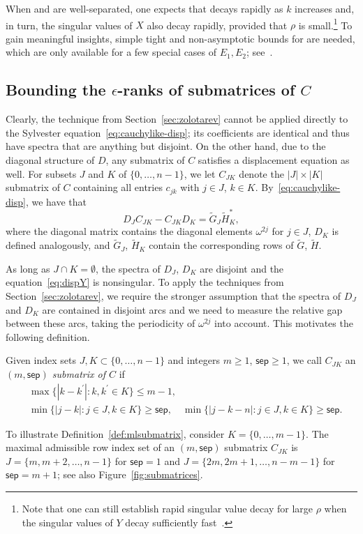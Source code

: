 \documentclass[final,reqno,onefignum,onetabnum]{siamart190516}
\newcommand{\sep}{\mathsf{sep}}
\begin{document}
When  and  are well-separated,
one expects that  decays rapidly as $k$ increases and, in turn, the singular values of $X$ also decay rapidly, provided that $\rho$ is small.\footnote{Note that one can still establish rapid singular value decay for large $\rho$ when the singular values of $Y$ decay sufficiently fast~\cite{townsend2018singular}.} 
To gain meaningful insights, simple tight and non-asymptotic bounds for  are needed, which are only available for a few special cases of $E_1,E_2$; see~\cite{Beckermann2019}.

\subsection{Bounding the $\epsilon$-ranks of submatrices of $C$} 
\label{sec:bounds}

Clearly, the technique from Section~\ref{sec:zolotarev} cannot be applied directly to the Sylvester equation~\eqref{eq:cauchylike-disp}; its coefficients are identical and thus have spectra that are anything but disjoint. 
On the other hand, due to the diagonal structure of $D$, any submatrix of $C$ satisfies a displacement equation as well. For subsets $J$ and $K$ of $\{0,\ldots,n\!-\!1\}$, we let $C_{JK}$ denote the $|J|\times |K|$ submatrix of $C$ containing all entries $c_{jk}$ with $j\in J$, $k \in K$.
By~\eqref{eq:cauchylike-disp}, we have that
\begin{equation}
\label{eq:dispY}
 D_J C_{JK} - C_{JK} D_K = \widetilde{G}_J \widetilde{H}_K^*,
\end{equation} 
where the diagonal matrix  contains the diagonal elements $\omega^{2j}$ for $j\in J$, $D_K$ is defined analogously, and 
$\widetilde{G}_J$, $\widetilde{H}_K$ contain the corresponding rows of 
$\widetilde{G}$, $\widetilde{H}$.

As long as $J \cap K = \emptyset$, the spectra of $D_J$, $D_K$ are disjoint and the equation~\eqref{eq:dispY} is nonsingular. To apply the techniques from Section~\ref{sec:zolotarev}, we require the stronger assumption that the spectra of $D_J$ and $D_K$ are contained in disjoint arcs and we need to measure the relative gap between these arcs, taking the periodicity of $\omega^{2j}$ into account. This motivates the following definition.
\begin{definition} \label{def:mlsubmatrix}
Given index sets $J, K \subset \{0,\ldots,n\!-\!1\}$ and integers $m \ge 1$, $\sep \ge 1$, we call $C_{JK}$ an \emph{$(m, \sep)$ submatrix of $C$} if 
\begin{align*}
 &\max\{ |k\!-\!k^\prime|: k, k^\prime \in K \} \le m\!-\!1, \\
 &\min\{ |j\!-\!k|: j \in J, k \in K\} \ge \sep, \quad \min\{ |j\!-\!k\!-\!n|: j \in J, k \in K\} \ge \sep.
\end{align*}
\end{definition}
To illustrate Definition~\ref{def:mlsubmatrix}, consider $K = \{0,\ldots,m\!-\!1\}$. The maximal admissible row index set of an $(m, \sep)$ submatrix $C_{JK}$ is $J = \{m,m+2,\ldots,n\!-\!1\}$ for $\sep = 1$ and $J = \{2m,2m\!+\!1,\ldots,n\!-m\!-\!1\}$ for $\sep = m\!+\!1$; see also Figure~\ref{fig:submatrices}.
\end{document}
